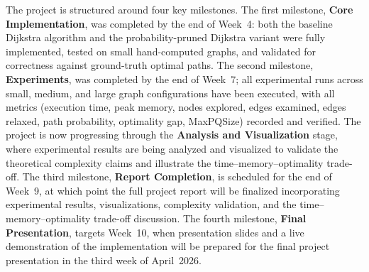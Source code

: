 The project is structured around four key milestones. The first milestone, \textbf{Core Implementation}, was completed by the end of Week~4: both the baseline Dijkstra algorithm and the probability-pruned Dijkstra variant were fully implemented, tested on small hand-computed graphs, and validated for correctness against ground-truth optimal paths. The second milestone, \textbf{Experiments}, was completed by the end of Week~7; all experimental runs across small, medium, and large graph configurations have been executed, with all metrics (execution time, peak memory, nodes explored, edges examined, edges relaxed, path probability, optimality gap, MaxPQSize) recorded and verified. The project is now progressing through the \textbf{Analysis and Visualization} stage, where experimental results are being analyzed and visualized to validate the theoretical complexity claims and illustrate the time--memory--optimality trade-off. The third milestone, \textbf{Report Completion}, is scheduled for the end of Week~9, at which point the full project report will be finalized incorporating experimental results, visualizations, complexity validation, and the time--memory--optimality trade-off discussion. The fourth milestone, \textbf{Final Presentation}, targets Week~10, when presentation slides and a live demonstration of the implementation will be prepared for the final project presentation in the third week of April~2026.
